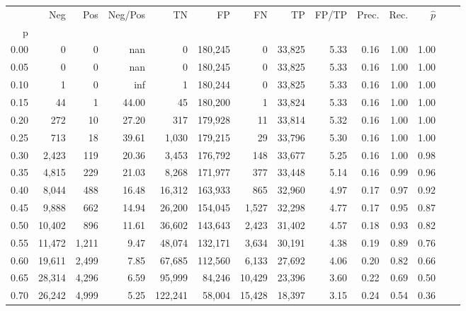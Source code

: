 \begin{tabular}{rrrrrrrrrrrrrr}
\toprule
{} &     Neg &    Pos & Neg/Pos &       TN &       FP &      FN &      TP & FP/TP & Prec. &  Rec. & $\hat{p}$ \\
p    &         &        &         &          &          &         &         &       &       &       &           \\
\midrule
0.00 &       0 &      0 &     nan &        0 &  180,245 &       0 &  33,825 &  5.33 &  0.16 &  1.00 &      1.00 \\
0.05 &       0 &      0 &     nan &        0 &  180,245 &       0 &  33,825 &  5.33 &  0.16 &  1.00 &      1.00 \\
0.10 &       1 &      0 &     inf &        1 &  180,244 &       0 &  33,825 &  5.33 &  0.16 &  1.00 &      1.00 \\
0.15 &      44 &      1 &   44.00 &       45 &  180,200 &       1 &  33,824 &  5.33 &  0.16 &  1.00 &      1.00 \\
0.20 &     272 &     10 &   27.20 &      317 &  179,928 &      11 &  33,814 &  5.32 &  0.16 &  1.00 &      1.00 \\
0.25 &     713 &     18 &   39.61 &    1,030 &  179,215 &      29 &  33,796 &  5.30 &  0.16 &  1.00 &      1.00 \\
0.30 &   2,423 &    119 &   20.36 &    3,453 &  176,792 &     148 &  33,677 &  5.25 &  0.16 &  1.00 &      0.98 \\
0.35 &   4,815 &    229 &   21.03 &    8,268 &  171,977 &     377 &  33,448 &  5.14 &  0.16 &  0.99 &      0.96 \\
0.40 &   8,044 &    488 &   16.48 &   16,312 &  163,933 &     865 &  32,960 &  4.97 &  0.17 &  0.97 &      0.92 \\
0.45 &   9,888 &    662 &   14.94 &   26,200 &  154,045 &   1,527 &  32,298 &  4.77 &  0.17 &  0.95 &      0.87 \\
0.50 &  10,402 &    896 &   11.61 &   36,602 &  143,643 &   2,423 &  31,402 &  4.57 &  0.18 &  0.93 &      0.82 \\
0.55 &  11,472 &  1,211 &    9.47 &   48,074 &  132,171 &   3,634 &  30,191 &  4.38 &  0.19 &  0.89 &      0.76 \\
0.60 &  19,611 &  2,499 &    7.85 &   67,685 &  112,560 &   6,133 &  27,692 &  4.06 &  0.20 &  0.82 &      0.66 \\
0.65 &  28,314 &  4,296 &    6.59 &   95,999 &   84,246 &  10,429 &  23,396 &  3.60 &  0.22 &  0.69 &      0.50 \\
0.70 &  26,242 &  4,999 &    5.25 &  122,241 &   58,004 &  15,428 &  18,397 &  3.15 &  0.24 &  0.54 &      0.36 \\

\end{tabular}
